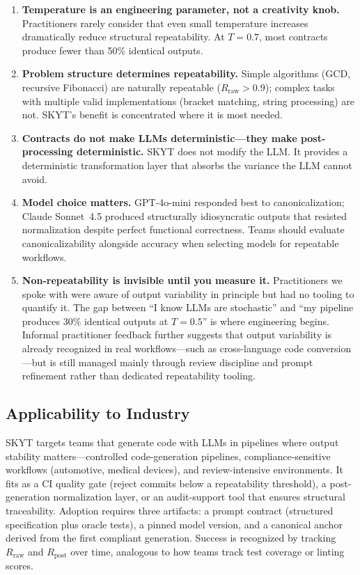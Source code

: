 \documentclass[sigconf]{acmart}
\begin{document}
\begin{enumerate}
  \item \textbf{Temperature is an engineering parameter, not a creativity knob.}  Practitioners rarely consider that even small temperature increases dramatically reduce structural repeatability.  At $T{=}0.7$, most contracts produce fewer than 50\% identical outputs.
  
  \item \textbf{Problem structure determines repeatability.}  Simple algorithms (GCD, recursive Fibonacci) are naturally repeatable ($R_{\text{raw}} > 0.9$); complex tasks with multiple valid implementations (bracket matching, string processing) are not.  SKYT's benefit is concentrated where it is most needed.
  
  \item \textbf{Contracts do not make LLMs deterministic---they make post-processing deterministic.}  SKYT does not modify the LLM.  It provides a deterministic transformation layer that absorbs the variance the LLM cannot avoid.
  
  \item \textbf{Model choice matters.}  GPT-4o-mini responded best to canonicalization; Claude Sonnet~4.5 produced structurally idiosyncratic outputs that resisted normalization despite perfect functional correctness.  Teams should evaluate canonicalizability alongside accuracy when selecting models for repeatable workflows.
  
  \item \textbf{Non-repeatability is invisible until you measure it.}  Practitioners we spoke with were aware of output variability in principle but had no tooling to quantify it.  The gap between ``I know LLMs are stochastic'' and ``my pipeline produces 30\% identical outputs at $T{=}0.5$'' is where engineering begins.  Informal practitioner feedback further suggests that output variability is already recognized in real workflows---such as cross-language code conversion---but is still managed mainly through review discipline and prompt refinement rather than dedicated repeatability tooling.
\end{enumerate}

\subsection{Applicability to Industry}
\label{sec:applicability}

SKYT targets teams that generate code with LLMs in pipelines where output stability matters---controlled code-generation pipelines, compliance-sensitive workflows (automotive, medical devices), and review-intensive environments. It fits as a CI quality gate (reject commits below a repeatability threshold), a post-generation normalization layer, or an audit-support tool that ensures structural traceability.  Adoption requires three artifacts: a prompt contract (structured specification plus oracle tests), a pinned model version, and a canonical anchor derived from the first compliant generation.  Success is recognized by tracking $R_{\text{raw}}$ and $R_{\text{post}}$ over time, analogous to how teams track test coverage or linting scores.
\end{document}
